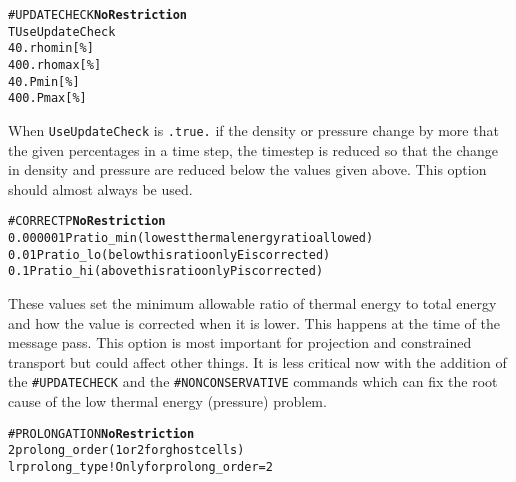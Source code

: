 \begin{alltt}
#UPDATECHECK     \hfill    {\bf No Restriction}
T                      UseUpdateCheck
40.                    rhomin[\%]
400.                   rhomax[\%]
40.                    Pmin[\%]
400.                   Pmax[\%]
\end{alltt}

When {\tt UseUpdateCheck} is {\tt .true.} if the density or pressure
change by more that the given percentages in a time step, the timestep 
is reduced so that the change in density and pressure are reduced below the
values given above. This option should almost always be used.
\ \ \\

\begin{alltt}
#CORRECTP        \hfill    {\bf No Restriction}
0.000001               Pratio_min (lowest thermal energy ratio allowed)
0.01                   Pratio_lo  (below this ratio only E is corrected)
0.1                    Pratio_hi  (above this ratio only P is corrected)
\end{alltt}

These values set the minimum allowable ratio of thermal energy to total
energy and how the value is corrected when it is lower.  This happens at
the time of the message pass.  This option is most important for 
projection and constrained transport but could affect other things. It
is less critical now with the addition of the {\tt \#UPDATECHECK} and
the {\tt \#NONCONSERVATIVE} commands which can fix the root cause of
the low thermal energy (pressure) problem.
\ \ \\

\begin{alltt}
#PROLONGATION   \hfill  {\bf No Restriction}
2                      prolong_order (1 or 2 for ghost cells)
lr                     prolong_type  ! Only for prolong_order=2
\end{alltt}


